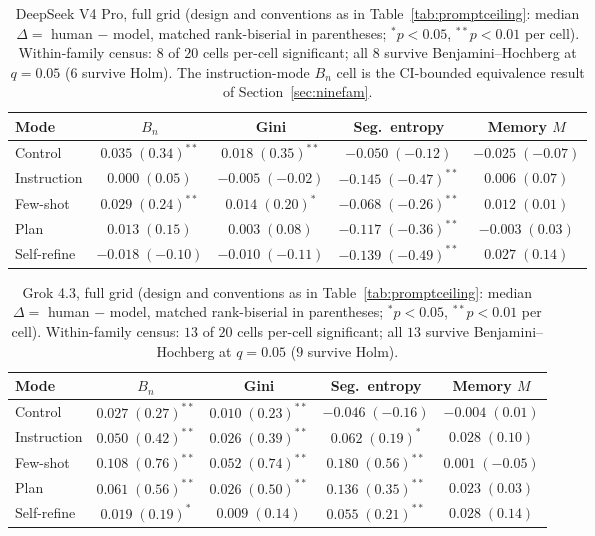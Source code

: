 \documentclass{article}
\begin{document}
\begin{table}[htbp]
\centering
\small
\caption{DeepSeek V4 Pro, full grid (design and conventions as in Table~\ref{tab:promptceiling}: median $\Delta =$ human $-$ model, matched rank-biserial in parentheses; $^{*}p<0.05$, $^{**}p<0.01$ per cell). Within-family census: $8$ of $20$ cells per-cell significant; all $8$ survive Benjamini--Hochberg at $q=0.05$ ($6$ survive Holm). The instruction-mode $B_n$ cell is the CI-bounded equivalence result of Section~\ref{sec:ninefam}.}
\label{tab:grid-deepseek-v4-pro}
\begin{tabular}{lcccc}
\toprule
Mode & $B_n$ & Gini & Seg.\ entropy & Memory $M$ \\
\midrule
Control & $0.035\;(0.34)^{**}$ & $0.018\;(0.35)^{**}$ & $-0.050\;(-0.12)$ & $-0.025\;(-0.07)$ \\
Instruction & $0.000\;(0.05)$ & $-0.005\;(-0.02)$ & $-0.145\;(-0.47)^{**}$ & $0.006\;(0.07)$ \\
Few-shot & $0.029\;(0.24)^{**}$ & $0.014\;(0.20)^{*}$ & $-0.068\;(-0.26)^{**}$ & $0.012\;(0.01)$ \\
Plan & $0.013\;(0.15)$ & $0.003\;(0.08)$ & $-0.117\;(-0.36)^{**}$ & $-0.003\;(0.03)$ \\
Self-refine & $-0.018\;(-0.10)$ & $-0.010\;(-0.11)$ & $-0.139\;(-0.49)^{**}$ & $0.027\;(0.14)$ \\
\bottomrule
\end{tabular}
\end{table}

\begin{table}[htbp]
\centering
\small
\caption{Grok 4.3, full grid (design and conventions as in Table~\ref{tab:promptceiling}: median $\Delta =$ human $-$ model, matched rank-biserial in parentheses; $^{*}p<0.05$, $^{**}p<0.01$ per cell). Within-family census: $13$ of $20$ cells per-cell significant; all $13$ survive Benjamini--Hochberg at $q=0.05$ ($9$ survive Holm).}
\label{tab:grid-grok-43}
\begin{tabular}{lcccc}
\toprule
Mode & $B_n$ & Gini & Seg.\ entropy & Memory $M$ \\
\midrule
Control & $0.027\;(0.27)^{**}$ & $0.010\;(0.23)^{**}$ & $-0.046\;(-0.16)$ & $-0.004\;(0.01)$ \\
Instruction & $0.050\;(0.42)^{**}$ & $0.026\;(0.39)^{**}$ & $0.062\;(0.19)^{*}$ & $0.028\;(0.10)$ \\
Few-shot & $0.108\;(0.76)^{**}$ & $0.052\;(0.74)^{**}$ & $0.180\;(0.56)^{**}$ & $0.001\;(-0.05)$ \\
Plan & $0.061\;(0.56)^{**}$ & $0.026\;(0.50)^{**}$ & $0.136\;(0.35)^{**}$ & $0.023\;(0.03)$ \\
Self-refine & $0.019\;(0.19)^{*}$ & $0.009\;(0.14)$ & $0.055\;(0.21)^{**}$ & $0.028\;(0.14)$ \\
\bottomrule
\end{tabular}
\end{table}
\end{document}
